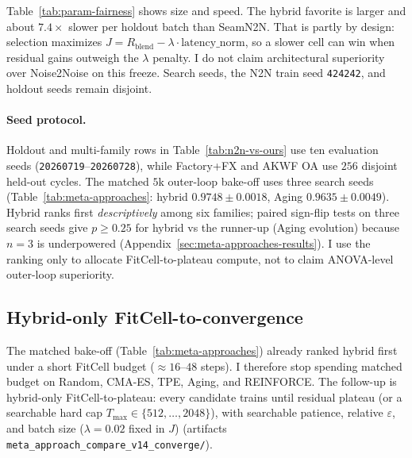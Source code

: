 Table~\ref{tab:param-fairness} shows size and speed.
The hybrid favorite is larger and about $7.4\times$ slower per holdout batch than SeamN2N.
That is partly by design: selection maximizes $J=R_{\mathrm{blend}}-\lambda\cdot\mathrm{latency\_norm}$,
so a slower cell can win when residual gains outweigh the $\lambda$ penalty.
I do not claim architectural superiority over Noise2Noise on this freeze.
Search seeds, the N2N train seed \texttt{424242}, and holdout seeds remain disjoint.

\paragraph{Seed protocol.}
Holdout and multi-family rows in Table~\ref{tab:n2n-vs-ours} use ten evaluation seeds (\texttt{20260719}--\texttt{20260728}), while Factory+FX and AKWF OA use $256$ disjoint held-out cycles.
The matched $5$k outer-loop bake-off uses three search seeds
(Table~\ref{tab:meta-approaches}: hybrid $0.9748{\pm}0.0018$, Aging $0.9635{\pm}0.0049$).
Hybrid ranks first \emph{descriptively} among six families; paired sign-flip tests on three search seeds give $p{\ge}0.25$ for hybrid vs the runner-up (Aging evolution) because $n{=}3$ is underpowered (Appendix~\ref{sec:meta-approaches-results}).
I use the ranking only to allocate FitCell-to-plateau compute, not to claim ANOVA-level outer-loop superiority.

\subsection{Hybrid-only FitCell-to-convergence}
\label{sec:v14-converge}
\label{sec:v14-hybrid-converge}

The matched bake-off (Table~\ref{tab:meta-approaches}) already ranked hybrid first under a short FitCell budget (${\approx}16$--$48$ steps).
I therefore stop spending matched budget on Random, CMA-ES, TPE, Aging, and REINFORCE.
The follow-up is hybrid-only FitCell-to-plateau: every candidate trains until residual plateau
(or a searchable hard cap $T_{\max}\!\in\!\{512,\ldots,2048\}$),
with searchable patience, relative $\varepsilon$, and batch size ($\lambda{=}0.02$ fixed in $J$)
(artifacts \texttt{meta\_approach\_compare\_v14\_converge/}).

